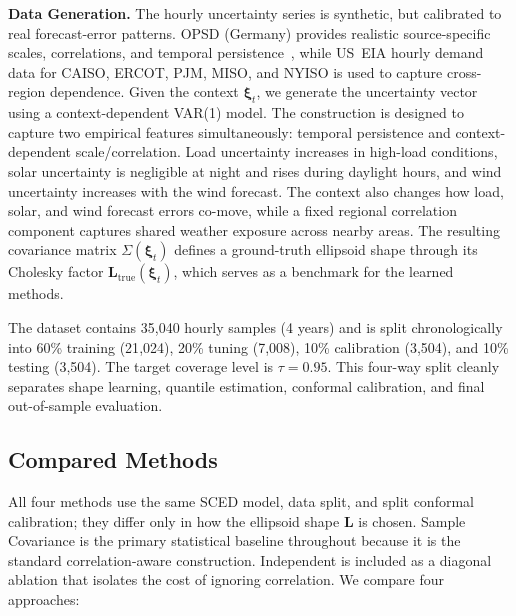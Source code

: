 \documentclass[11pt]{article}
\newcommand{\bxi}{\bm{\xi}}
\newcommand{\bL}{\bm{L}}
\theoremstyle{definition}
\begin{document}
\textbf{Data Generation.} The hourly uncertainty series is synthetic, but calibrated to real forecast-error patterns. OPSD (Germany) provides realistic source-specific scales, correlations, and temporal persistence~\citep{opsd2020}, while US~EIA hourly demand data for CAISO, ERCOT, PJM, MISO, and NYISO is used to capture cross-region dependence. Given the context $\bxi_t$, we generate the uncertainty vector using a context-dependent VAR(1) model. The construction is designed to capture two empirical features simultaneously: temporal persistence and context-dependent scale/correlation. Load uncertainty increases in high-load conditions, solar uncertainty is negligible at night and rises during daylight hours, and wind uncertainty increases with the wind forecast. The context also changes how load, solar, and wind forecast errors co-move, while a fixed regional correlation component captures shared weather exposure across nearby areas. The resulting covariance matrix $\Sigma(\bxi_t)$ defines a ground-truth ellipsoid shape through its Cholesky factor $\bL_{\mathrm{true}}(\bxi_t)$, which serves as a benchmark for the learned methods.

The dataset contains 35{,}040 hourly samples (4 years) and is split chronologically into 60\% training (21{,}024), 20\% tuning (7{,}008), 10\% calibration (3{,}504), and 10\% testing (3{,}504). The target coverage level is $\tau=0.95$. This four-way split cleanly separates shape learning, quantile estimation, conformal calibration, and final out-of-sample evaluation.

\subsection{Compared Methods}

All four methods use the same SCED model, data split, and split conformal calibration; they differ only in how the ellipsoid shape $\bL$ is chosen. Sample Covariance is the primary statistical baseline throughout because it is the standard correlation-aware construction. Independent is included as a diagonal ablation that isolates the cost of ignoring correlation. We compare four approaches:
\end{document}
